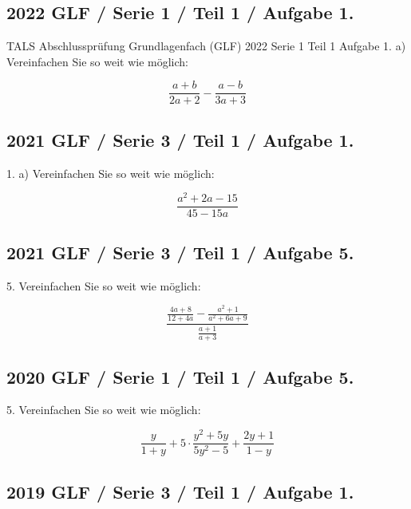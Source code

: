 \subsection*{2022 GLF / Serie 1 / Teil 1 / Aufgabe 1.}
TALS Abschlussprüfung Grundlagenfach (GLF) 2022 Serie 1 Teil 1 Aufgabe
1. a) Vereinfachen Sie so weit wie möglich:

$$\frac{a+b}{2a+2} - \frac{a-b}{3a+3}$$


\subsection*{2021 GLF / Serie 3 / Teil 1 / Aufgabe 1.}

1. a) Vereinfachen Sie so weit wie möglich:

$$\frac{a^2+2a-15}{45-15a}$$



\subsection*{2021 GLF / Serie 3 / Teil 1 / Aufgabe 5.}

5. Vereinfachen Sie so weit wie möglich:

$$\frac{\frac{4a+8}{12+4a} - \frac{a^2+1}{a^2+6a+9}}{\frac{a+1}{a+3}}$$


\subsection*{2020 GLF / Serie 1 / Teil 1 / Aufgabe 5.}

5. Vereinfachen Sie so weit wie möglich:

$$\frac{y}{1+y} + 5\cdot{} \frac{y^2+5y}{5y^2-5} + \frac{2y+1}{1-y}$$


\subsection*{2019 GLF / Serie 3 / Teil 1 / Aufgabe 1.}

